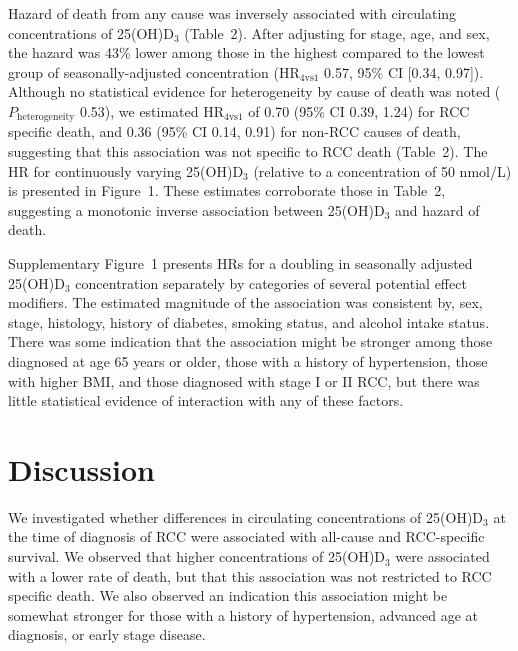\documentclass[a4paper,11pt]{article}
\begin{document}
Hazard of death from any cause was inversely associated with 
circulating concentrations of 25(OH)D$_3$ (Table~2). After adjusting for 
stage, age, and sex, the hazard was 43\% lower among those in the highest 
compared to the lowest group of seasonally-adjusted concentration 
(HR$_{4\text{vs}1}$ 0.57, 95\% CI [0.34, 0.97]). Although no statistical 
evidence for heterogeneity by cause of death was noted 
($P_\text{heterogeneity}$ 0.53), we estimated HR$_{4\text{vs}1}$ of 0.70 
(95\% CI 0.39, 1.24) for RCC specific death, and 0.36 (95\% CI 0.14, 0.91) for 
non-RCC causes of death, suggesting that this association was not specific to 
RCC death (Table~2). The HR for continuously varying 25(OH)D$_3$ (relative to a 
concentration of 50 nmol/L) is presented in Figure~1. These estimates 
corroborate those in Table~2, suggesting a monotonic inverse association between 
25(OH)D$_3$ and hazard of death.

Supplementary Figure~1 presents HRs for a doubling in seasonally adjusted 
25(OH)D$_3$ concentration separately by categories of several potential effect 
modifiers. The estimated magnitude of the association was consistent by, sex, stage, 
histology, history of diabetes, smoking status, and alcohol intake status. 
There was some indication that the association might be stronger among those 
diagnosed at age 65 years or older, those with a history of hypertension, those 
with higher BMI, and those diagnosed with stage I or II RCC, but there was 
little statistical evidence of interaction with any of these factors. 

\section*{Discussion}
We investigated whether differences in circulating concentrations of 
25(OH)D$_3$ at the time of diagnosis of RCC were associated with all-cause and 
RCC-specific survival. We observed that higher concentrations of 25(OH)D$_3$ 
were associated with a lower rate of death, but that this association was not 
restricted to RCC specific death. We also observed an indication this 
association might be somewhat stronger for those with a 
history of hypertension, advanced age at diagnosis, or early stage disease.
\end{document}
